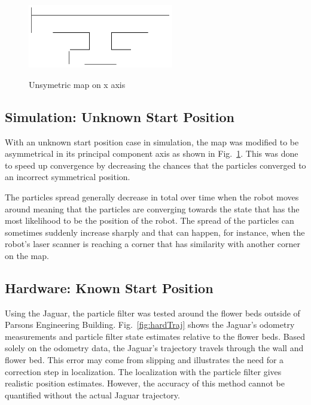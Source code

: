 \documentclass[conference]{../IEEEtran}
\begin{document}
\begin{figure}[t]
\centering
\includegraphics[width=2.5in]{figures/small_map.pdf}
\label{fig:usmap}
\caption{Unsymetric map on x axis}
\end{figure}


\subsection{Simulation: Unknown Start Position}

With an unknown start position case in simulation, the map was modified to be asymmetrical
in its principal component axis as shown in Fig.~\ref{fig:usmap}. This was done to speed
up convergence by decreasing the chances that the particles converged to an incorrect
symmetrical position.

The particles spread generally decrease in total over time when the robot moves around
meaning that the particles are converging towards the state that has the most likelihood
to be the position of the robot.  The spread of the particles can sometimes suddenly
increase sharply and that can happen, for instance, when the robot's laser scanner is
reaching a corner that has similarity with another corner on the map.

\subsection{Hardware: Known Start Position}
Using the Jaguar, the particle filter was tested around the flower beds outside of Parsons
Engineering Building.  Fig.~\ref{fig:hardTraj} shows the Jaguar's odometry measurements
and particle filter state estimates relative to the flower beds.  Based solely on the
odometry data, the Jaguar's trajectory travels through the wall and flower bed.  This
error may come from slipping and illustrates the need for a correction step in
localization.  The localization with the particle filter gives realistic position
estimates.  However, the accuracy of this method cannot be quantified without the actual
Jaguar trajectory.
\end{document}
